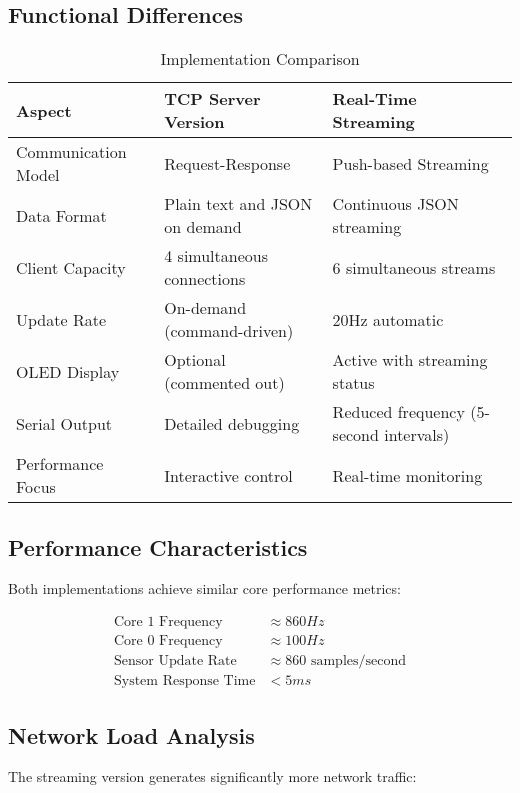\documentclass[12pt,a4paper]{article}
\begin{document}
\subsection{Functional Differences}

\begin{table}[H]
\centering
\caption{Implementation Comparison}
\begin{tabular}{|p{3cm}|p{5cm}|p{5cm}|}
\hline
\textbf{Aspect} & \textbf{TCP Server Version} & \textbf{Real-Time Streaming} \\
\hline
Communication Model & Request-Response & Push-based Streaming \\
\hline
Data Format & Plain text and JSON on demand & Continuous JSON streaming \\
\hline
Client Capacity & 4 simultaneous connections & 6 simultaneous streams \\
\hline
Update Rate & On-demand (command-driven) & 20Hz automatic \\
\hline
OLED Display & Optional (commented out) & Active with streaming status \\
\hline
Serial Output & Detailed debugging & Reduced frequency (5-second intervals) \\
\hline
Performance Focus & Interactive control & Real-time monitoring \\
\hline
\end{tabular}
\end{table}

\subsection{Performance Characteristics}

Both implementations achieve similar core performance metrics:

\begin{align}
\text{Core 1 Frequency} &\approx 860Hz \\
\text{Core 0 Frequency} &\approx 100Hz \\
\text{Sensor Update Rate} &\approx 860 \text{ samples/second} \\
\text{System Response Time} &< 5ms
\end{align}

\subsection{Network Load Analysis}

The streaming version generates significantly more network traffic:
\end{document}
